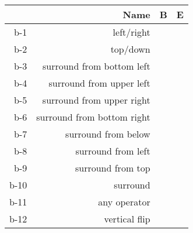 \begin{tabular}[pos]{ | r | r | c | c | }
\hline
 & {\mktsStyleBold{}Name} & {\mktsStyleBold{}B} & {\mktsStyleBold{}E}\\

\hline
{\mktsStyleBold{}b-1} & left/right & \cjkgGlue{\cjk{}\cjkgGlue{\cnjzr{}}\cjkgGlue{}}\cjkgGlue{} & \cjkgGlue{\cjk{}\cjkgGlue{\cnjzr{}}\cjkgGlue{}}\cjkgGlue{}\\
{\mktsStyleBold{}b-2} & top/down & \cjkgGlue{\cjk{}\cjkgGlue{\cnjzr{}}\cjkgGlue{}}\cjkgGlue{} & \cjkgGlue{\cjk{}\cjkgGlue{\cnjzr{}}\cjkgGlue{}}\cjkgGlue{}\\
{\mktsStyleBold{}b-3} & surround from bottom left & \cjkgGlue{\cjk{}\cjkgGlue{\cnjzr{}}\cjkgGlue{}}\cjkgGlue{} & \cjkgGlue{\cjk{}／}\cjkgGlue{}\\
{\mktsStyleBold{}b-4} & surround from upper left & \cjkgGlue{\cjk{}\cjkgGlue{\cnjzr{}}\cjkgGlue{}}\cjkgGlue{} & \cjkgGlue{\cjk{}\cjkgGlue{\cnjzr{}}\cjkgGlue{}}\cjkgGlue{}\\
{\mktsStyleBold{}b-5} & surround from upper right & \cjkgGlue{\cjk{}\cjkgGlue{\cnjzr{}}\cjkgGlue{}}\cjkgGlue{} & \cjkgGlue{\cjk{}\cjkgGlue{\cnjzr{}}\cjkgGlue{}}\cjkgGlue{}\\
{\mktsStyleBold{}b-6} & surround from bottom right & \cjkgGlue{\cjk{}\cjkgGlue{\cnjzr{}}\cjkgGlue{}}\cjkgGlue{} & \cjkgGlue{\cjk{}\cjkgGlue{\cnjzr{}}\cjkgGlue{}}\cjkgGlue{}\\
{\mktsStyleBold{}b-7} & surround from below & \cjkgGlue{\cjk{}\cjkgGlue{\cnjzr{}}\cjkgGlue{}}\cjkgGlue{} & \cjkgGlue{\cjk{}\cjkgGlue{\cnjzr{}}\cjkgGlue{}}\cjkgGlue{}\\
{\mktsStyleBold{}b-8} & surround from left & \cjkgGlue{\cjk{}\cjkgGlue{\cnjzr{}}\cjkgGlue{}}\cjkgGlue{} & \cjkgGlue{\cjk{}\cjkgGlue{\cnjzr{}}\cjkgGlue{}}\cjkgGlue{}\\
{\mktsStyleBold{}b-9} & surround from top & \cjkgGlue{\cjk{}\cjkgGlue{\cnjzr{}}\cjkgGlue{}}\cjkgGlue{} & \cjkgGlue{\cjk{}\cjkgGlue{\cnjzr{}}\cjkgGlue{}}\cjkgGlue{}\\
{\mktsStyleBold{}b-10} & surround & \cjkgGlue{\cjk{}\cjkgGlue{\cnjzr{}}\cjkgGlue{}}\cjkgGlue{} & \cjkgGlue{\cjk{}\cjkgGlue{\cnjzr{}}\cjkgGlue{}}\cjkgGlue{}\\
{\mktsStyleBold{}b-11} & any operator &  & \cjkgGlue{\cjk{}\cjkgGlue{\cnjzr{}}\cjkgGlue{}}\cjkgGlue{}\\
{\mktsStyleBold{}b-12} & vertical flip &  & \cjkgGlue{\cjk{}\cjkgGlue{\cnjzr{}}\cjkgGlue{}}\cjkgGlue{}\\
\hline
\end{tabular}



